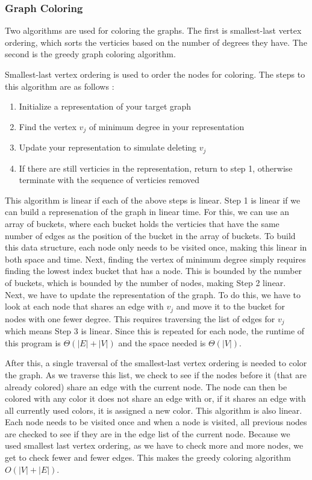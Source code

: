 \documentclass{article}
\begin{document}
        \subsubsection{Graph Coloring}
        Two algorithms are used for coloring the graphs. The first is smallest-last vertex ordering, which sorts the verticies based on the number of degrees they have. The second is the greedy graph coloring algorithm.
        \par
        Smallest-last vertex ordering is used to order the nodes for coloring. The steps to this algorithm are as follows \cite{slv}:
        \begin{enumerate}
            \item Initialize a representation of your target graph
            \item Find the vertex $v_j$ of minimum degree in your representation
            \item Update your representation to simulate deleting $v_j$
            \item If there are still verticies in the representation, return to step 1, otherwise terminate with the sequence of verticies removed
        \end{enumerate}
        This algorithm is linear if each of the above steps is linear. Step 1 is linear if we can build a represenation of the graph in linear time. For this, we can use an array of buckets, where each bucket holds the verticies that have the same number of edges as the position of the bucket in the array of buckets. To build this data structure, each node only needs to be visited once, making this linear in both space and time. Next, finding the vertex of minimum degree simply requires finding the lowest index bucket that has a node. This is bounded by the number of buckets, which is bounded by the number of nodes, making Step 2 linear. Next, we have to update the representation of the graph. To do this, we have to look at each node that shares an edge with $v_j$ and move it to the bucket for nodes with one fewer degree. This requires traversing the list of edges for $v_j$ which means Step 3 is linear. Since this is repeated for each node, the runtime of this program is $\Theta\left(|E| + |V|\right)$ and the space needed is $\Theta(|V|)$.
        \par
        After this, a single traversal of the smallest-last vertex ordering is needed to color the graph. As we traverse this list, we check to see if the nodes before it (that are already colored) share an edge with the current node. The node can then be colored with any color it does not share an edge with or, if it shares an edge with all currently used colors, it is assigned a new color. This algorithm is also linear. Each node needs to be visited once and when a node is visited, all previous nodes are checked to see if they are in the edge list of the current node. Because we used smallest last vertex ordering, as we have to check more and more nodes, we get to check fewer and fewer edges. This makes the greedy coloring algorithm $O(|V| + |E|)$.
\end{document}
